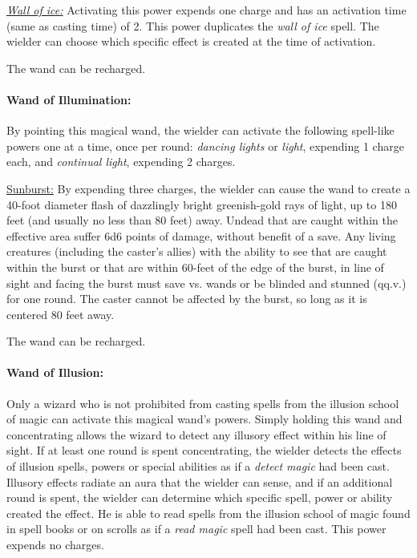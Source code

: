 \begin{multicols}{2}
\underline{\textit{Wall of ice:}} Activating this power expends one charge and has an activation time (same as casting time) of 2.  This power duplicates the \textit{wall of ice} spell.  The wielder can choose which specific effect is created at the time of activation.

The wand can be recharged.

\paragraph{Wand of Illumination:} By pointing this magical wand, the wielder can activate the following spell-like powers one at a time, once per round: \textit{dancing lights} or \textit{light}, expending 1 charge each, and \textit{continual light}, expending 2 charges.

\underline{Sunburst:} By expending three charges, the wielder can cause the wand to create a 40-foot diameter flash of dazzlingly bright greenish-gold rays of light, up to 180 feet (and usually no less than 80 feet) away.   Undead that are caught within the effective area suffer 6d6 points of damage, without benefit of a save.  Any living creatures (including the caster's allies) with the ability to see that are caught within the burst or that are within 60-feet of the edge of the burst, in line of sight and facing the burst must save vs. wands or be blinded and stunned (qq.v.) for one round.  The caster cannot be affected by the burst, so long as it is centered 80 feet away.

The wand can be recharged.

\paragraph{Wand of Illusion:} Only a wizard who is not prohibited from casting spells from the illusion school of magic can activate this magical wand's powers.  Simply holding this wand and concentrating allows the wizard to detect any illusory effect within his line of sight.  If at least one round is spent concentrating, the wielder detects the effects of illusion spells, powers or special abilities as if a \textit{detect magic} had been cast.  Illusory effects radiate an aura that the wielder can sense, and if an additional round is spent, the wielder can determine which specific spell, power or ability created the effect.  He is able to read spells from the illusion school of magic found in spell books or on scrolls as if a \textit{read magic} spell had been cast.  This power expends no charges.


\end{multicols}
